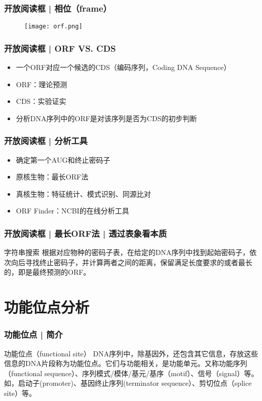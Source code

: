 \begin{frame}
  \frametitle{开放阅读框 | 相位（frame）}
  \begin{figure}
    \centering
    \texttt{[image: orf.png]}
  \end{figure}
\end{frame}

\begin{frame}
  \frametitle{开放阅读框 | \alert{ORF VS. CDS}}
  \pause
  \begin{itemize}
    \item 一个ORF对应一个候选的CDS（编码序列，Coding DNA Sequence）
    \item ORF：理论预测
    \item CDS：实验证实
    \item 分析DNA序列中的ORF是对该序列是否为CDS的初步判断
  \end{itemize}
\end{frame}

\begin{frame}
  \frametitle{开放阅读框 | 分析工具}
  \begin{itemize}
    \item 确定第一个AUG和终止密码子
    \item 原核生物：最长ORF法
    \item 真核生物：特征统计、模式识别、同源比对
    \item ORF Finder：NCBI的在线分析工具
  \end{itemize}
\end{frame}

\begin{frame}
  \frametitle{开放阅读框 | 最长ORF法 | 透过表象看本质}
  \begin{block}{字符串搜索}
  根据对应物种的密码子表，在给定的DNA序列中找到起始密码子，依次向后寻找终止密码子，并计算两者之间的距离，保留满足长度要求的或者最长的，即是最终预测的ORF。
  \end{block}
\end{frame}

\section{功能位点分析}
\begin{frame}
  \frametitle{功能位点 | 简介}
  \begin{block}{功能位点（functional site）}
    DNA序列中，除基因外，还包含其它信息，存放这些信息的DNA片段称为功能位点。它们与功能相关，是功能单元。又称功能序列（functional sequence）、序列模式/模体/基元/基序（motif）、信号（signal）等。如，启动子(promoter)、基因终止序列(terminator sequence）、剪切位点（splice site）等。
  \end{block}
\end{frame}

